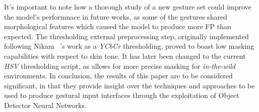 \documentclass[10pt,twocolumn,letterpaper]{article}
\begin{document}
\begin{flushleft}
It's important to note how a thorough study of a new gesture set could improve the model's performnace in future works, as some of the gestures shared morphological features which caused the model to produce more FP than expected.
The thresholding external preprocessing step, originally implemented following Nikam \etal~\cite{7916786}'s work as a \textit{YCbCr} thresholding, proved to boast low masking capabilities with respect to skin tone. It has later been changed to the current \textit{HSV} thresholding script, as allows for more precise masking for \textit{in-the-wild} environments.\linebreak
In conclusion, the results of this paper are to be considered significant, in that they provide insight over the techniques and approaches to be used to produce gestural input interfaces through the exploitation of Object Detector Neural Networks.\linebreak
\end{flushleft}

\pagebreak
{\small


}
\end{document}
